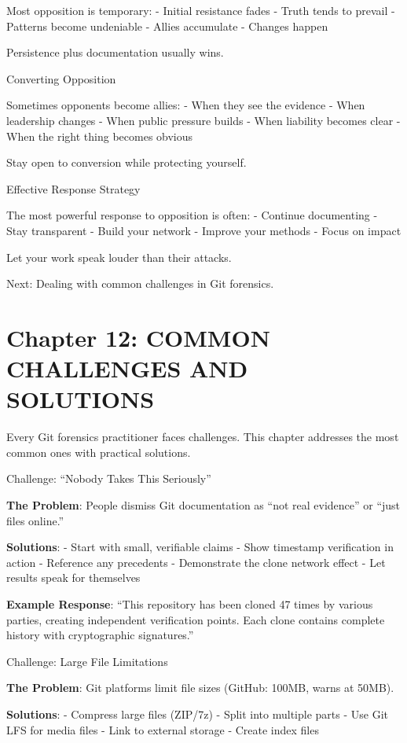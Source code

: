 Most opposition is temporary: - Initial resistance fades - Truth tends
to prevail - Patterns become undeniable - Allies accumulate - Changes
happen

Persistence plus documentation usually wins.

Converting Opposition

Sometimes opponents become allies: - When they see the evidence - When
leadership changes - When public pressure builds - When liability
becomes clear - When the right thing becomes obvious

Stay open to conversion while protecting yourself.

Effective Response Strategy

The most powerful response to opposition is often: - Continue
documenting - Stay transparent - Build your network - Improve your
methods - Focus on impact

Let your work speak louder than their attacks.

Next: Dealing with common challenges in Git forensics.

\section{Chapter 12: COMMON CHALLENGES AND
SOLUTIONS}\label{chapter-12-common-challenges-and-solutions}

Every Git forensics practitioner faces challenges. This chapter
addresses the most common ones with practical solutions.

Challenge: ``Nobody Takes This Seriously''

\textbf{The Problem}: People dismiss Git documentation as ``not real
evidence'' or ``just files online.''

\textbf{Solutions}: - Start with small, verifiable claims - Show
timestamp verification in action - Reference any precedents -
Demonstrate the clone network effect - Let results speak for themselves

\textbf{Example Response}: ``This repository has been cloned 47 times by
various parties, creating independent verification points. Each clone
contains complete history with cryptographic signatures.''

Challenge: Large File Limitations

\textbf{The Problem}: Git platforms limit file sizes (GitHub: 100MB,
warns at 50MB).

\textbf{Solutions}: - Compress large files (ZIP/7z) - Split into
multiple parts - Use Git LFS for media files - Link to external storage
- Create index files

